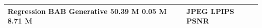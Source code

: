 \begin{tabular}{ll}
\toprule
Regression BAB Generative 50.39 M 0.05 M 8.71 M & JPEG LPIPS PSNR \\
\midrule
\bottomrule
\end{tabular}
